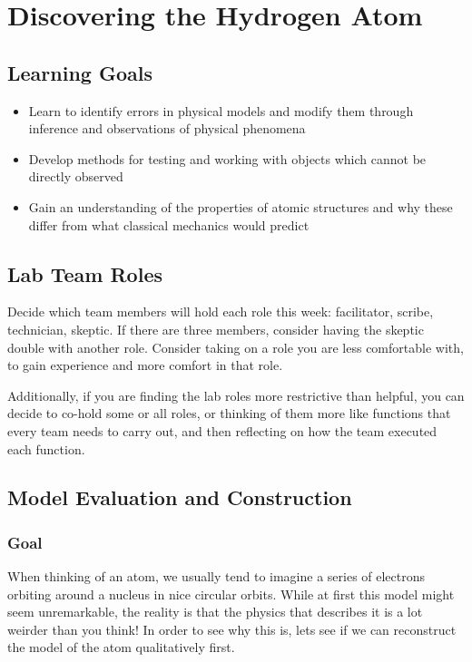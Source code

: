 \chapter{Discovering the Hydrogen Atom}

\section{Learning Goals}

\begin{itemize}
	\item Learn to identify errors in physical models and modify them through inference and observations of physical phenomena
	
	\item Develop methods for testing and working with objects which cannot be directly observed
	
	\item Gain an understanding of the properties of atomic structures and why these differ from what classical mechanics would predict
\end{itemize}

\section{Lab Team Roles}

Decide which team members will hold each role this week: facilitator, scribe, technician, skeptic. If there are three members, consider having the skeptic double with another role. Consider taking on a role you are less comfortable with, to gain experience and more comfort in that role.

Additionally, if you are finding the lab roles more restrictive than helpful, you can decide to co-hold some or all roles, or thinking of them more like functions that every team needs to carry out, and then reflecting on how the team executed each function.

\section{Model Evaluation and Construction} 

\subsection{Goal} 
When thinking of an atom, we usually tend to imagine a series of electrons orbiting around a nucleus in nice circular orbits. While at first this model might seem unremarkable, the reality is that the physics that describes it is a lot weirder than you think! In order to see why this is, lets see if we can reconstruct the model of the atom qualitatively first.

